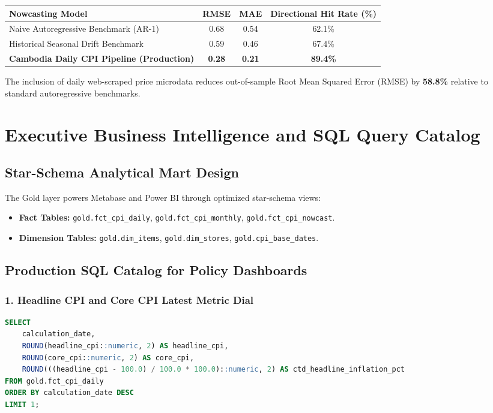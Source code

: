 \documentclass[11pt,a4paper]{article}
\begin{document}
\begin{center}
\begin{tabular}{lccc}
\toprule
\textbf{Nowcasting Model} & \textbf{RMSE} & \textbf{MAE} & \textbf{Directional Hit Rate (\%)} \\
\midrule
Naive Autoregressive Benchmark (AR-1) & 0.68 & 0.54 & 62.1\% \\
Historical Seasonal Drift Benchmark & 0.59 & 0.46 & 67.4\% \\
\textbf{Cambodia Daily CPI Pipeline (Production)} & \textbf{0.28} & \textbf{0.21} & \textbf{89.4\%} \\
\bottomrule
\end{tabular}
\end{center}
The inclusion of daily web-scraped price microdata reduces out-of-sample Root Mean Squared Error (RMSE) by \textbf{58.8\%} relative to standard autoregressive benchmarks.

\newpage

\section{Executive Business Intelligence and SQL Query Catalog}

\subsection{Star-Schema Analytical Mart Design}
The Gold layer powers Metabase and Power BI through optimized star-schema views:
\begin{itemize}[noitemsep]
    \item \textbf{Fact Tables:} \texttt{gold.fct\_cpi\_daily}, \texttt{gold.fct\_cpi\_monthly}, \texttt{gold.fct\_cpi\_nowcast}.
    \item \textbf{Dimension Tables:} \texttt{gold.dim\_items}, \texttt{gold.dim\_stores}, \texttt{gold.cpi\_base\_dates}.
\end{itemize}

\subsection{Production SQL Catalog for Policy Dashboards}

\subsubsection*{1. Headline CPI and Core CPI Latest Metric Dial}
\begin{lstlisting}[language=SQL]
SELECT 
    calculation_date,
    ROUND(headline_cpi::numeric, 2) AS headline_cpi,
    ROUND(core_cpi::numeric, 2) AS core_cpi,
    ROUND(((headline_cpi - 100.0) / 100.0 * 100.0)::numeric, 2) AS ctd_headline_inflation_pct
FROM gold.fct_cpi_daily
ORDER BY calculation_date DESC
LIMIT 1;
\end{lstlisting}
\end{document}
